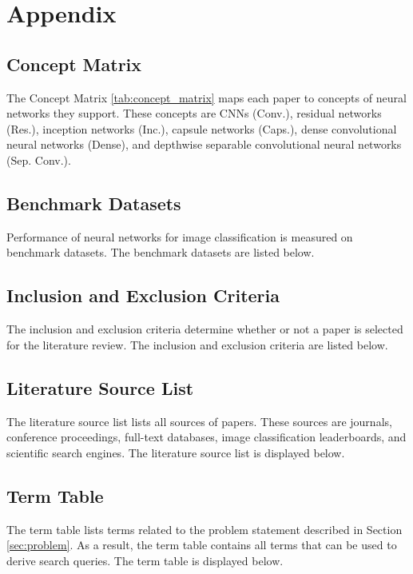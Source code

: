 \chapter{Appendix}

\section{Concept Matrix}
The Concept Matrix \ref{tab:concept_matrix} maps each paper to concepts of neural networks they support. These concepts are \ac{CNN}s (Conv.), residual networks (Res.), inception networks (Inc.), capsule networks (Caps.), dense convolutional neural networks (Dense), and depthwise separable convolutional neural networks (Sep. Conv.).


\section{Benchmark Datasets}
Performance of neural networks for image classification is measured on benchmark datasets. The benchmark datasets are listed below. 
\label{sec:benchmark}


\section{Inclusion and Exclusion Criteria}
The inclusion and exclusion criteria determine whether or not a paper is selected for the literature review. The inclusion and exclusion criteria are listed below.
\label{sec:krit}


\section{Literature Source List}
The literature source list lists all sources of papers. These sources are journals, conference proceedings, full-text databases, image classification leaderboards, and scientific search engines. The literature source list is displayed below.
\label{sec:source}


\section{Term Table}
The term table lists terms related to the problem statement described in Section \ref{sec:problem}. As a result, the term table contains all terms that can be used to derive search queries. The term table is displayed below.
\label{sec:termtable}


